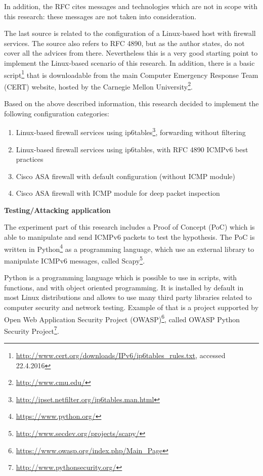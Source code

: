 \documentclass[12pt]{article}
\begin{document}
In addition, the RFC cites messages and technologies which are not in scope with this research: these messages are not taken into consideration.

The last source is related to the configuration of a Linux-based host with firewall services. The source also refers to RFC 4890, but as the author states, do not cover all the advices from there. Nevertheless this is a very good starting point to implement the Linux-based scenario of this research\cite{ip6tablesGiobbi}. In addition, there is a basic script\footnote{\url{http://www.cert.org/downloads/IPv6/ip6tables_rules.txt}, accessed 22.4.2016} that is downloadable from the main Computer Emergency Response Team (CERT) website, hosted by the Carnegie Mellon University\footnote{\url{http://www.cmu.edu/}}. 

Based on the above described information, this research decided to implement the following configuration categories:
\vspace{-10pt}
\begin{enumerate}[noitemsep,topsep=0pt,partopsep=0pt]
 \label{confCategories}
 \item Linux-based firewall services using ip6tables\footnote{\url{http://ipset.netfilter.org/ip6tables.man.html}}, forwarding without filtering
 \item Linux-based firewall services using ip6tables, with RFC 4890 ICMPv6 best practices
 \item Cisco ASA firewall with default configuration (without ICMP module)
 \item Cisco ASA firewall with ICMP module for deep packet inspection
\end{enumerate}


\textbf{Testing/Attacking application}
\label{subsub:framework}

The experiment part of this research includes a Proof of Concept (PoC) which is able to manipulate and send ICMPv6 packets to test the hypothesis. The PoC is written in Python\footnote{\url{https://www.python.org/}} as a programming language, which use an external library to manipulate ICMPv6 messages, called Scapy\footnote{\url{http://www.secdev.org/projects/scapy/}}.

Python is a programming language which is possible to use in scripts, with functions, and with object oriented programming. It is installed by default in most Linux distributions and allows to use many third party libraries related to computer security and network testing. Example of that is a project supported by Open Web Application Security Project (OWASP)\footnote{\url{https://www.owasp.org/index.php/Main_Page}}, called OWASP Python Security Project\footnote{\url{http://www.pythonsecurity.org/}}.
\end{document}
